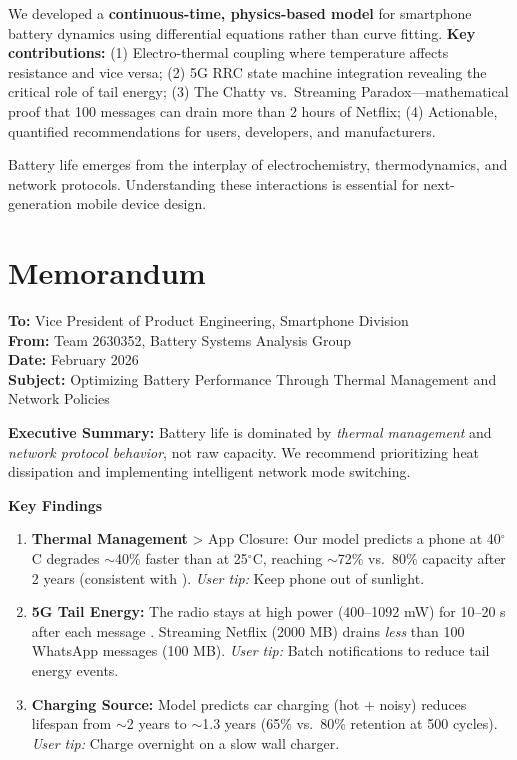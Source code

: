 \documentclass[12pt]{article}
\newcommand{\Team}{2630352}
\begin{document}
We developed a \textbf{continuous-time, physics-based model} for smartphone battery dynamics using differential equations rather than curve fitting. \textbf{Key contributions:} (1) Electro-thermal coupling where temperature affects resistance and vice versa; (2) 5G RRC state machine integration revealing the critical role of tail energy; (3) The Chatty vs.\ Streaming Paradox---mathematical proof that 100 messages can drain more than 2 hours of Netflix; (4) Actionable, quantified recommendations for users, developers, and manufacturers.

Battery life emerges from the interplay of electrochemistry, thermodynamics, and network protocols. Understanding these interactions is essential for next-generation mobile device design.

\newpage
\section*{Memorandum}

\noindent\textbf{To:} Vice President of Product Engineering, Smartphone Division \\
\textbf{From:} Team \Team, Battery Systems Analysis Group \\
\textbf{Date:} February 2026 \\
\textbf{Subject:} Optimizing Battery Performance Through Thermal Management and Network Policies

\vspace{0.5em}
\noindent\textbf{Executive Summary:} Battery life is dominated by \textit{thermal management} and \textit{network protocol behavior}, not raw capacity. We recommend prioritizing heat dissipation and implementing intelligent network mode switching.

\vspace{0.5em}
\noindent\textbf{Key Findings}
\begin{enumerate}
    \item \textbf{Thermal Management} \textgreater{} App Closure: Our model predicts a phone at 40$^\circ$C degrades $\sim$40\% faster than at 25$^\circ$C, reaching $\sim$72\% vs.\ 80\% capacity after 2 years (consistent with \cite{nasa_battery}). \textit{User tip:} Keep phone out of sunlight.
    
    \item \textbf{5G Tail Energy:} The radio stays at high power (400--1092 mW) for 10--20 s after each message \cite{narayanan_5g}. Streaming Netflix (2000 MB) drains \textit{less} than 100 WhatsApp messages (100 MB). \textit{User tip:} Batch notifications to reduce tail energy events.
    
    \item \textbf{Charging Source:} Model predicts car charging (hot + noisy) reduces lifespan from $\sim$2 years to $\sim$1.3 years (65\% vs.\ 80\% retention at 500 cycles). \textit{User tip:} Charge overnight on a slow wall charger.
\end{enumerate}
\end{document}
